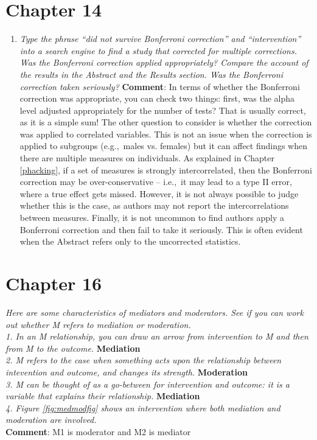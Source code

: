 \documentclass{krantz}
\providecommand{\tightlist}{%
\setlength{\itemsep}{0pt}\setlength{\parskip}{0pt}}
\begin{document}
\hypertarget{chapter-14}{%
\section{Chapter 14}\label{chapter-14}}

\begin{enumerate}
\def\labelenumi{\arabic{enumi}.}
\tightlist
\item
  \emph{Type the phrase ``did not survive Bonferroni correction'' and ``intervention'' into a search engine to find a study that corrected for multiple corrections. Was the Bonferroni correction applied appropriately? Compare the account of the results in the Abstract and the Results section. Was the Bonferroni correction taken seriously?}
  \textbf{Comment}: In terms of whether the Bonferroni correction was appropriate, you can check two things: first, was the alpha level adjusted appropriately for the number of tests? That is usually correct, as it is a simple sum! The other question to consider is whether the correction was applied to correlated variables. This is not an issue when the correction is applied to subgroups (e.g.,~males vs. females) but it can affect findings when there are multiple measures on individuals. As explained in Chapter \ref{phacking}, if a set of measures is strongly intercorrelated, then the Bonferroni correction may be over-conservative -- i.e.,~it may lead to a type II error, where a true effect gets missed. However, it is not always possible to judge whether this is the case, as authors may not report the intercorrelations between measures. Finally, it is not uncommon to find authors apply a Bonferroni correction and then fail to take it seriously. This is often evident when the Abstract refers only to the uncorrected statistics.
\end{enumerate}

\hypertarget{chapter-16}{%
\section{Chapter 16}\label{chapter-16}}

\emph{Here are some characteristics of mediators and moderators. See if you can work out whether M refers to mediation or moderation.}\\
\emph{1. In an M relationship, you can draw an arrow from intervention to M and then from M to the outcome.} \textbf{Mediation}\\
\emph{2. M refers to the case when something acts upon the relationship between intevention and outcome, and changes its strength.} \textbf{Moderation}\\
\emph{3. M can be thought of as a go-between for intervention and outcome: it is a variable that explains their relationship.} \textbf{Mediation}\\
\emph{4. Figure \ref{fig:medmodfig} shows an intervention where both mediation and moderation are involved.}\\
\textbf{Comment}: M1 is moderator and M2 is mediator
\end{document}
